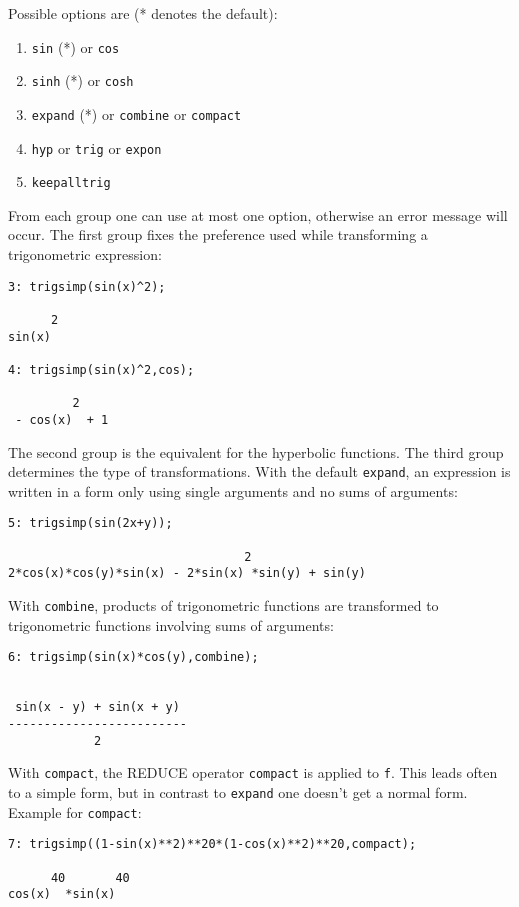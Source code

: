 Possible options are (* denotes the default):
\begin{enumerate}
\item {\tt sin} (*) or {\tt cos}
\item {\tt sinh} (*) or {\tt cosh}
\item {\tt expand} (*) or {\tt combine} or {\tt compact}
\item {\tt hyp} or {\tt trig} or {\tt expon}
\item {\tt keepalltrig}
\end{enumerate}

From each group one can use at most one option, otherwise an error
message will occur. The first group fixes the preference used while
transforming a trigonometric expression:
{\small
\begin{verbatim}
3: trigsimp(sin(x)^2);

      2
sin(x)

4: trigsimp(sin(x)^2,cos);

         2
 - cos(x)  + 1
\end{verbatim}
}\noindent

The second group is the equivalent for the hyperbolic functions.
The third group determines the type of transformations. With
the default {\tt expand}, an expression is written in a form only using
single arguments and no sums of arguments:
{\small
\begin{verbatim}
5: trigsimp(sin(2x+y));

                                 2
2*cos(x)*cos(y)*sin(x) - 2*sin(x) *sin(y) + sin(y)
\end{verbatim}
}\noindent

With {\tt combine}, products of trigonometric functions are transformed to
trigonometric functions involving sums of arguments:
{\small
\begin{verbatim}
6: trigsimp(sin(x)*cos(y),combine);


 sin(x - y) + sin(x + y)
-------------------------
            2
\end{verbatim}
}\noindent

With {\tt compact}, the REDUCE operator {\tt compact} \cite{hearns}
is applied to {\tt f}.
This leads often to a simple form, but in contrast to {\tt expand} one
doesn't get a normal form. Example for {\tt compact}:
{\small
\begin{verbatim}
7: trigsimp((1-sin(x)**2)**20*(1-cos(x)**2)**20,compact);

      40       40
cos(x)  *sin(x)
\end{verbatim}
}\noindent

